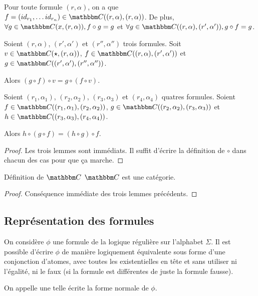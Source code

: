 \begin{lem}
    Pour toute formule $(r,\alpha)$, on a que
        $f=(id_{r_1},\dots id_{r_n})\in\C((r,\alpha),(r,\alpha))$.
    De plus, $\forall g\in\C(x, (r,\alpha)), f\circ g = g$
    et $\forall g\in\C((r,\alpha), (r',\alpha')), g\circ f = g$.
\end{lem}

\begin{lem}
    Soient $(r,\alpha)$, $(r',\alpha')$ et $(r'',\alpha'')$ trois formules.
    Soit $v\in\C(\star,(r,\alpha))$,
    $f\in\C((r,\alpha), (r',\alpha'))$ et $g\in\C((r',\alpha'), (r'',\alpha''))$.

    Alors $(g\circ f)\circ v = g\circ (f\circ v)$.
\end{lem}

\begin{lem}
    Soient $(r_1,\alpha_1)$, $(r_2,\alpha_2)$, $(r_3,\alpha_3)$ et $(r_4,\alpha_4)$
    quatres formules.
    Soient $f\in\C((r_1,\alpha_1), (r_2,\alpha_2))$,
    $g\in\C((r_2,\alpha_2), (r_3,\alpha_3))$ et $h\in\C((r_3,\alpha_3),(r_4,\alpha_4))$.

    Alors $h\circ(g\circ f) = (h\circ g)\circ f$.
\end{lem}

\begin{proof} Les trois lemmes sont immédiats. Il suffit d'écrire la définition de $\circ$
    dans chacun des cas pour que ça marche.
\end{proof}

\begin{theo}{Définition de $\C$}
    $\C$ est une catégorie.
\end{theo}

\begin{proof} Conséquence immédiate des trois lemmes précédents.
\end{proof}

\subsection{Représentation des formules}

\begin{lem}
    On considère $\phi$ une formule de la logique régulière sur l'alphabet
    $\Sigma$.  Il est possible d'écrire $\phi$ de manière logiquement
    équivalente sous forme d'une conjonction d'atomes, avec toutes les
    existentielles en tête et sans utiliser ni l'égalité, ni le faux (si la
    formule est différentes de juste la formule fausse).

    On appelle une telle écrite la forme normale de $\phi$.
\end{lem}

